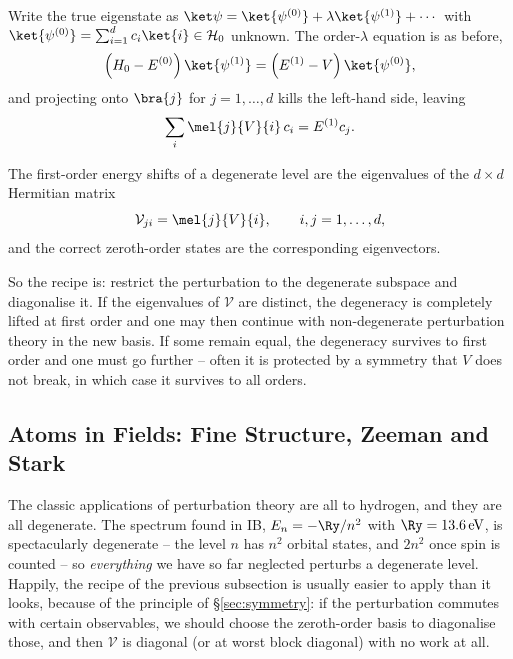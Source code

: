 Write the true eigenstate as $\ket\psi = \ket{\psi^{(0)}} + \lambda\ket{\psi^{(1)}}+\cdots$ with $\ket{\psi^{(0)}} = \sum_{i=1}^d c_i \ket{i} \in \mathcal{H}_0$ unknown. The order-$\lambda$ equation is as before,
$$
\left( H_0 - E^{(0)} \right)\ket{\psi^{(1)}} = \left( E^{(1)} - V \right)\ket{\psi^{(0)}},
$$
and projecting onto $\bra{j}$ for $j = 1,\dots,d$ kills the left-hand side, leaving
$$
\sum_{i}\mel{j}{V}{i}\, c_i = E^{(1)} c_j.
$$

\begin{theorem}
    The first-order energy shifts of a degenerate level are the eigenvalues of the $d\times d$ Hermitian matrix
    $$
    \mathcal{V}_{ji} = \mel{j}{V}{i}, \qquad i,j = 1,\dots,d,
    $$
    and the correct zeroth-order states are the corresponding eigenvectors.
\end{theorem}

So the recipe is: restrict the perturbation to the degenerate subspace and diagonalise it. If the eigenvalues of $\mathcal{V}$ are distinct, the degeneracy is completely lifted at first order and one may then continue with non-degenerate perturbation theory in the new basis. If some remain equal, the degeneracy survives to first order and one must go further -- often it is protected by a symmetry that $V$ does not break, in which case it survives to all orders.

\begin{center}
\end{center}

\subsection{Atoms in Fields: Fine Structure, Zeeman and Stark}

The classic applications of perturbation theory are all to hydrogen, and they are all degenerate. The spectrum found in IB, $E_n = -\Ry/n^2$ with $\Ry = 13.6\,\mathrm{eV}$, is spectacularly degenerate -- the level $n$ has $n^2$ orbital states, and $2n^2$ once spin is counted -- so \emph{everything} we have so far neglected perturbs a degenerate level. Happily, the recipe of the previous subsection is usually easier to apply than it looks, because of the principle of \S\ref{sec:symmetry}: if the perturbation commutes with certain observables, we should choose the zeroth-order basis to diagonalise those, and then $\mathcal{V}$ is diagonal (or at worst block diagonal) with no work at all.


